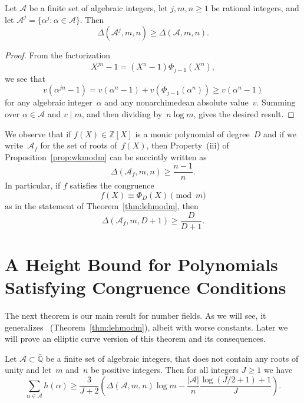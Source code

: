 \begin{proposition}
\label{prop:DAjmngeDAmn}
Let ${{\mathcal A}}$ be a finite set of algebraic integers,
let $j,m,n\ge1$ be rational integers, and 
let ${{\mathcal A}}^j=\{{\alpha}^j:{\alpha}\in{{\mathcal A}}\}$. Then
\[
  {\Delta}({{\mathcal A}}^j,m,n) \ge {\Delta}({{\mathcal A}},m,n).
\]
\end{proposition}
\begin{proof}
From the factorization
\[
  X^{jn}-1 = (X^n-1){\Phi}_{j-1}(X^n),
\]
we see that
\[
  v({\alpha}^{jn}-1)=v({\alpha}^{n}-1)+v({\Phi}_{j-1}({\alpha}^n))\ge v({\alpha}^{n}-1)
\]
for any algebraic integer~${\alpha}$ and any nonarchimedean absolute
value~$v$. Summing over ${\alpha}\in{{\mathcal A}}$ and $v\mid m$, and then
dividing by~$n\log m$, gives the desired result.
\end{proof}

\begin{remark}
\label{remark:DAfmD1geDD1}
We observe that if $f(X)\in{\mathbb{Z}}[X]$ is a monic polynomial of degree~$D$
and if we write~${{\mathcal A}}_f$ for the set of roots of~$f(X)$, then
Property~(iii) of Proposition~\ref{prop:wkmodm} can be succintly
written as
\begin{equation}
  \label{eqn:DAfmD1geDD1}
  \Delta({{\mathcal A}}_f,m,n) \ge \frac{n-1}{n}.
\end{equation}
In particular, if $f$ satisfies the congruence
\[
  f(X)  \equiv {\Phi}_D(X) \pmod{m}
\]
as in the statement of Theorem~\ref{thm:lehmodm}, then
\[
  \Delta({{\mathcal A}}_f,m,D+1) \ge \frac{D}{D+1}.
\]
\end{remark}

\section{A Height Bound for Polynomials Satisfying Congruence Conditions}
\label{section:htbdforpolys}

The next theorem is our main result for number fields.  As
we will see, it generalizes~\cite{BoDoMo,BoHaMo,DuMo,GaIsMoPiWi}
(Theorem~\ref{thm:lehmodm}), albeit with worse constants.  Later we
will prove an elliptic curve version of this theorem and its
consequences.

\begin{theorem}
\label{thm:hageCDAmnlogm}
Let ${{\mathcal A}}\subset\bar{\mathbb{Q}}$ be a finite set of algebraic integers, that
does not contain any roots of unity and let~$m$ and~$n$ be positive
integers. Then for all integers $J\ge1$ we have
\begin{equation}
  \label{eqn:sumhageDAmnlogm}
  \sum_{{\alpha}\in{{\mathcal A}}}h({\alpha}) \ge \frac{3}{J+2}\left(
  {\Delta}({{\mathcal A}},m,n) \log m
    - \frac{|{{\mathcal A}}|}{n}\frac{\log(J/2+1)+1}{J}\right).
\end{equation}
\end{theorem}

